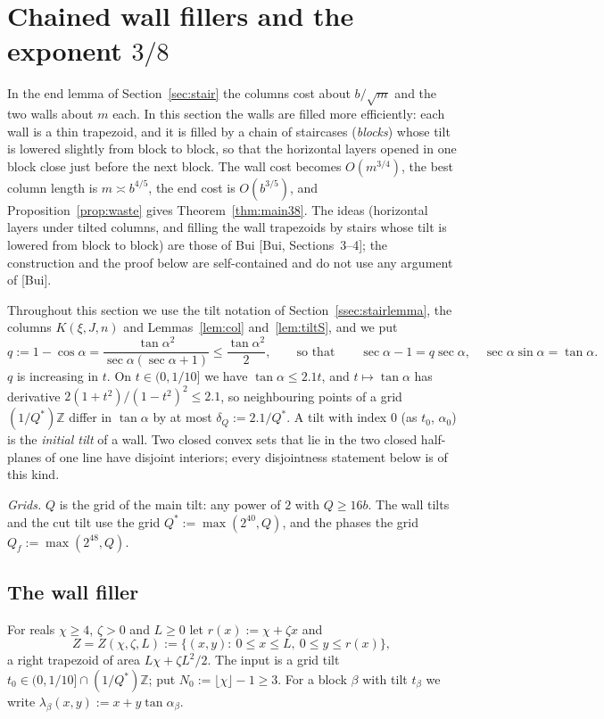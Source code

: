 \documentclass[11pt]{amsart}
\newcommand{\Z}{\mathbb Z}
\newcommand{\ca}{\cos\alpha}
\newcommand{\sa}{\sin\alpha}
\newcommand{\ta}{\tan\alpha}
\newcommand{\se}{\sec\alpha}
\theoremstyle{definition}
\theoremstyle{remark}
\numberwithin{equation}{section}
\begin{document}
\section{Chained wall fillers and the exponent \texorpdfstring{$3/8$}{3/8}}\label{sec:38}

In the end lemma of Section~\ref{sec:stair} the columns cost about $b/\sqrt m$ and the two walls about $m$ each. In this
section the walls are filled more efficiently: each wall is a thin trapezoid, and it is filled by a chain of
staircases (\emph{blocks}) whose tilt is lowered slightly from block to block, so that the horizontal layers opened in
one block close just before the next block. The wall cost becomes $O(m^{3/4})$, the best column length is
$m\asymp b^{4/5}$, the end cost is $O(b^{3/5})$, and Proposition~\ref{prop:waste} gives Theorem~\ref{thm:main38}. The
ideas (horizontal layers under tilted columns, and filling the wall trapezoids by stairs whose tilt is lowered from
block to block) are those of Bui [Bui, Sections~3--4]; the construction and the proof below are self-contained and do not
use any argument of [Bui].

Throughout this section we use the tilt notation of Section~\ref{ssec:stairlemma}, the columns $K(\xi,J,n)$ and
Lemmas~\ref{lem:col} and~\ref{lem:tiltS}, and we put
\[
q:=1-\ca=\frac{\ta^2}{\se(\se+1)}\le\frac{\ta^2}2,\qquad\text{so that}\qquad \se-1=q\se,\quad \se\sa=\ta .
\]
$q$ is increasing in $t$. On $t\in(0,1/10]$ we have $\ta\le2.1t$, and $t\mapsto\ta$ has derivative
$2(1+t^2)/(1-t^2)^2\le2.1$, so neighbouring points of a grid $(1/Q^*)\Z$ differ in $\ta$ by at most
$\delta_Q:=2.1/Q^*$. A tilt with index $0$ (as $t_0$, $\alpha_0$) is the \emph{initial tilt} of a wall. Two closed convex
sets that lie in the two closed half-planes of one line have disjoint interiors; every disjointness statement below is
of this kind.

\emph{Grids.} $Q$ is the grid of the main tilt: any power of $2$ with $Q\ge16b$. The wall tilts and the cut tilt use the
grid $Q^*:=\max(2^{40},Q)$, and the phases the grid $Q_f:=\max(2^{48},Q)$.

\subsection{The wall filler}\label{ssec:wall}
For reals $\chi\ge4$, $\zeta>0$ and $L\ge0$ let $r(x):=\chi+\zeta x$ and
\[
Z=Z(\chi,\zeta,L):=\{(x,y):\ 0\le x\le L,\ 0\le y\le r(x)\},
\]
a right trapezoid of area $L\chi+\zeta L^2/2$. The input is a grid tilt $t_0\in(0,1/10]\cap(1/Q^*)\Z$; put
$N_0:=\lfloor\chi\rfloor-1\ge3$. For a block $\beta$ with tilt $t_\beta$ we write $\lambda_\beta(x,y):=x+y\tan\alpha_\beta$.
\end{document}
